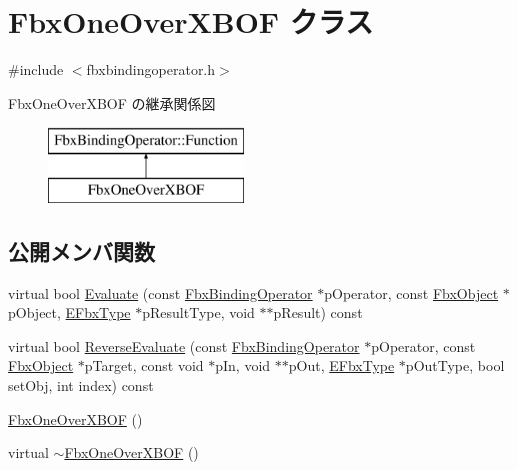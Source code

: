 \hypertarget{class_fbx_one_over_x_b_o_f}{}\section{Fbx\+One\+Over\+X\+B\+OF クラス}
\label{class_fbx_one_over_x_b_o_f}


{\ttfamily \#include $<$fbxbindingoperator.\+h$>$}

Fbx\+One\+Over\+X\+B\+OF の継承関係図\begin{figure}[H]
\begin{center}
\leavevmode
\includegraphics[height=2.000000cm]{class_fbx_one_over_x_b_o_f}
\end{center}
\end{figure}
\subsection*{公開メンバ関数}
\begin{DoxyCompactItemize}
\item 
virtual bool \hyperlink{class_fbx_one_over_x_b_o_f_a373df11d5ad550e76e2edc28f4182f92}{Evaluate} (const \hyperlink{class_fbx_binding_operator}{Fbx\+Binding\+Operator} $\ast$p\+Operator, const \hyperlink{class_fbx_object}{Fbx\+Object} $\ast$p\+Object, \hyperlink{fbxpropertytypes_8h_a73913a5ddfb20e57c6f25e9e6784bd92}{E\+Fbx\+Type} $\ast$p\+Result\+Type, void $\ast$$\ast$p\+Result) const
\item 
virtual bool \hyperlink{class_fbx_one_over_x_b_o_f_afa8f32a5706dd4cfee3f69547fdeebe4}{Reverse\+Evaluate} (const \hyperlink{class_fbx_binding_operator}{Fbx\+Binding\+Operator} $\ast$p\+Operator, const \hyperlink{class_fbx_object}{Fbx\+Object} $\ast$p\+Target, const void $\ast$p\+In, void $\ast$$\ast$p\+Out, \hyperlink{fbxpropertytypes_8h_a73913a5ddfb20e57c6f25e9e6784bd92}{E\+Fbx\+Type} $\ast$p\+Out\+Type, bool set\+Obj, int index) const
\item 
\hyperlink{class_fbx_one_over_x_b_o_f_a597f7c1e603906da75e10dc844744834}{Fbx\+One\+Over\+X\+B\+OF} ()
\item 
virtual \hyperlink{class_fbx_one_over_x_b_o_f_a0e5a38d0274da6566a972b50099e8523}{$\sim$\+Fbx\+One\+Over\+X\+B\+OF} ()
\end{DoxyCompactItemize}
